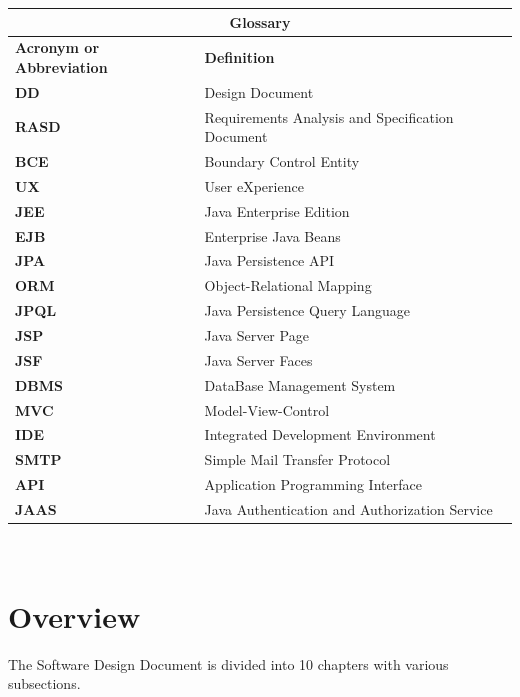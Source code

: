 \documentclass[12pt]{book}
\begin{document}
\begin{tabular}{ |l|l| }
  \hline
  \hline
  \multicolumn{2}{|c|}{\large{\textbf{Glossary}}} \\
  \hline
  \hline
  \textbf{Acronym or Abbreviation} & \textbf{Definition} \\
  \hline
  \textbf{DD} & Design Document\\
  \textbf{RASD} & Requirements Analysis and Specification Document\\
  \textbf{BCE} & Boundary Control Entity \\
  \textbf{UX} & User eXperience\\
  \textbf{JEE} & Java Enterprise Edition\\
  \textbf{EJB} & Enterprise Java Beans\\
  \textbf{JPA} & Java Persistence API\\
  \textbf{ORM} & Object-Relational Mapping\\
  \textbf{JPQL} & Java Persistence Query Language\\
  \textbf{JSP} & Java Server Page\\
  \textbf{JSF} & Java Server Faces\\
  \textbf{DBMS} & DataBase Management System\\
  \textbf{MVC} & Model-View-Control\\
  \textbf{IDE} & Integrated Development Environment \\
  \textbf{SMTP} & Simple Mail Transfer Protocol\\
  \textbf{API} & Application Programming Interface\\
  \textbf{JAAS} & Java Authentication and Authorization Service\\

  \hline
  \hline
\end{tabular} \\

\section{Overview}

The Software Design Document is divided into 10 chapters with various subsections.\\
\end{document}
